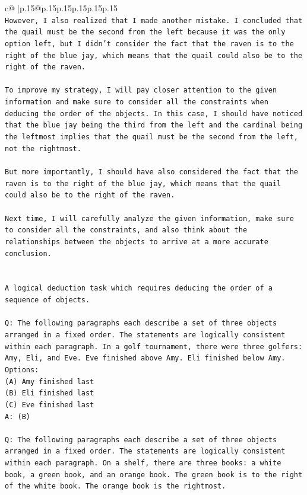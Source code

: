 \documentclass{article}
\begin{document}
{\begin{supertabular}{c@{$\;$}|p{.15\linewidth}@{}p{.15\linewidth}p{.15\linewidth}p{.15\linewidth}p{.15\linewidth}p{.15\linewidth}}
{{{\\ 
\texttt{However, I also realized that I made another mistake. I concluded that the quail must be the second from the left because it was the only option left, but I didn't consider the fact that the raven is to the right of the blue jay, which means that the quail could also be to the right of the raven. } \\
\\ 
\texttt{To improve my strategy, I will pay closer attention to the given information and make sure to consider all the constraints when deducing the order of the objects. In this case, I should have noticed that the blue jay being the third from the left and the cardinal being the leftmost implies that the quail must be the second from the left, not the rightmost. } \\
\\ 
\texttt{But more importantly, I should have also considered the fact that the raven is to the right of the blue jay, which means that the quail could also be to the right of the raven. } \\
\\ 
\texttt{Next time, I will carefully analyze the given information, make sure to consider all the constraints, and also think about the relationships between the objects to arrive at a more accurate conclusion.} \\
\\ 
\\ 
\texttt{A logical deduction task which requires deducing the order of a sequence of objects.} \\
\\ 
\texttt{Q: The following paragraphs each describe a set of three objects arranged in a fixed order. The statements are logically consistent within each paragraph. In a golf tournament, there were three golfers: Amy, Eli, and Eve. Eve finished above Amy. Eli finished below Amy.} \\
\texttt{Options:} \\
\texttt{(A) Amy finished last} \\
\texttt{(B) Eli finished last} \\
\texttt{(C) Eve finished last} \\
\texttt{A: (B)} \\
\\ 
\texttt{Q: The following paragraphs each describe a set of three objects arranged in a fixed order. The statements are logically consistent within each paragraph. On a shelf, there are three books: a white book, a green book, and an orange book. The green book is to the right of the white book. The orange book is the rightmost.} \\
}}}
\end{supertabular}}
\end{document}
